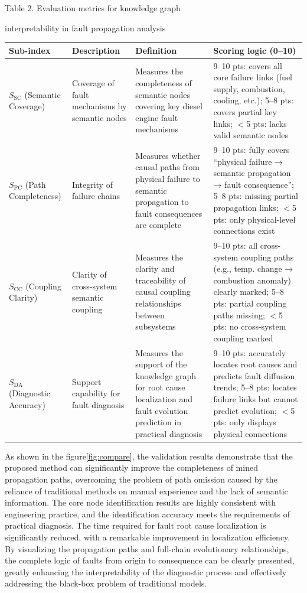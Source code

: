 \documentclass[conference]{IEEEconf}
\begin{document}
\begin{table}[!hbp]
\centering
\centerline{Table 2. Evaluation metrics for knowledge graph}
\centerline{interpretability in fault propagation analysis}
\scriptsize
\begin{tabular}{|p{1.0cm}|p{1.4cm}|p{2.2cm}|p{2.6cm}|}
\hline
\textbf{Sub-index} & \textbf{Description} & \textbf{Definition} & \textbf{Scoring logic (0–10)} \\
\hline
$S_{\text{SC}}$ (Semantic Coverage) & Coverage of fault mechanisms by semantic nodes & Measures the completeness of semantic nodes covering key diesel engine fault mechanisms & 9–10 pts: covers all core failure links (fuel supply, combustion, cooling, etc.); 5–8 pts: covers partial key links; $<$5 pts: lacks valid semantic nodes \\
\hline
$S_{\text{PC}}$ (Path Completeness) & Integrity of failure chains & Measures whether causal paths from physical failure to semantic propagation to fault consequences are complete & 9–10 pts: fully covers “physical failure → semantic propagation → fault consequence”; 5–8 pts: missing partial propagation links; $<$5 pts: only physical-level connections exist \\
\hline
$S_{\text{CC}}$ (Coupling Clarity) & Clarity of cross-system semantic coupling & Measures the clarity and traceability of causal coupling relationships between subsystems & 9–10 pts: all cross-system coupling paths (e.g., temp. change → combustion anomaly) clearly marked; 5–8 pts: partial coupling paths missing; $<$5 pts: no cross-system coupling marked \\
\hline
$S_{\text{DA}}$ (Diagnostic Accuracy) & Support capability for fault diagnosis & Measures the support of the knowledge graph for root cause localization and fault evolution prediction in practical diagnosis & 9–10 pts: accurately locates root causes and predicts fault diffusion trends; 5–8 pts: locates failure links but cannot predict evolution; $<$5 pts: only displays physical connections \\
\hline
\end{tabular}
\label{tab:interpretability_metrics}
\end{table}
As shown in the figure\ref{fig:compare}, the validation results demonstrate that the proposed method can significantly improve the completeness of mined propagation paths, overcoming the problem of path omission caused by the reliance of traditional methods on manual experience and the lack of semantic information. The core node identification results are highly consistent with engineering practice, and the identification accuracy meets the requirements of practical diagnosis. The time required for fault root cause localization is significantly reduced, with a remarkable improvement in localization efficiency. By visualizing the propagation paths and full-chain evolutionary relationships, the complete logic of faults from origin to consequence can be clearly presented, greatly enhancing the interpretability of the diagnostic process and effectively addressing the black-box problem of traditional models.
\end{document}
